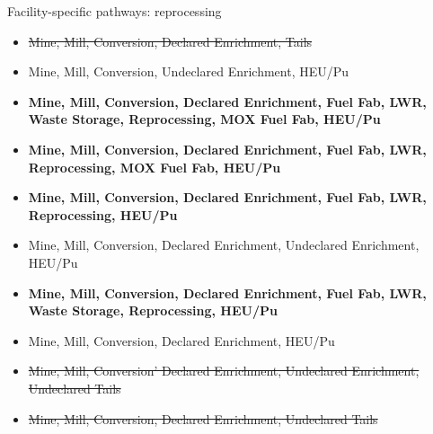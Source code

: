 \begin{frame}{Facility-specific pathways: reprocessing}
    \begin{itemize}
        \item \st{Mine, Mill, Conversion, Declared Enrichment, Tails}
        \item Mine, Mill, Conversion, Undeclared Enrichment, HEU/Pu
        \item \textbf{Mine, Mill, Conversion, Declared Enrichment, Fuel Fab, LWR, Waste Storage, Reprocessing, MOX Fuel Fab, HEU/Pu}
        \item \textbf{Mine, Mill, Conversion, Declared Enrichment, Fuel Fab, LWR, Reprocessing, MOX Fuel Fab, HEU/Pu}
        \item \textbf{Mine, Mill, Conversion, Declared Enrichment, Fuel Fab, LWR, Reprocessing, HEU/Pu}
        \item Mine, Mill, Conversion, Declared Enrichment, Undeclared Enrichment, HEU/Pu
        \item \textbf{Mine, Mill, Conversion, Declared Enrichment, Fuel Fab, LWR, Waste Storage, Reprocessing, HEU/Pu}
        \item Mine, Mill, Conversion, Declared Enrichment, HEU/Pu
        \item \st{Mine, Mill, Conversion' Declared Enrichment, Undeclared Enrichment, Undeclared Tails}
        \item \st{Mine, Mill, Conversion, Declared Enrichment, Undeclared Tails}
    \end{itemize}
\end{frame}

